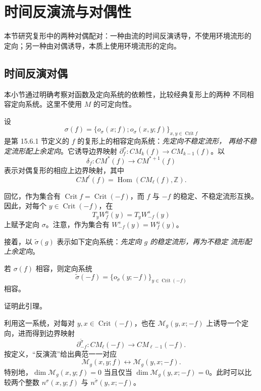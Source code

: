 \section{时间反演流与对偶性}
\label{sec:time-reversal-flow-duality}

本节研究\personFloer{}复形中的两种对偶配对：一种由流的时间反演诱导，不使用环境流形的
定向；另一种由\personPoincare{}对偶诱导，本质上使用环境流形的定向。

\subsection{时间反演对偶}
\label{subsec:time-reversal-duality}

本小节通过明确考察对\personMorse{}函数及定向系统的依赖性，比较经典\personMorse{}复形上的两种
不同相容定向系统。这里不使用 $M$ 的可定向性。

设
\[
 \sigma(f)=\{o_\sigma(x;f);o_\sigma(x,y;f)\}_{x,y\in\operatorname{Crit}f}
\]
是第 15.6.1 节定义的 $f$ 的\personMorse{}复形上的相容定向系统：\emph{先定向不稳定流形，
再给不稳定流形配上余定向}。它诱导\personMorse{}边界映射
$\partial_f^\sigma:CM_k(f)\to CM_{k-1}(f)$。以
\[
 \delta_f:CM^*(f)\longrightarrow CM^{*+1}(f)
\]
表示对偶复形的相应上边界映射，其中
\[
 CM^\ell(f)=\operatorname{Hom}(CM_\ell(f),\mathbb Z).
\]

回忆，作为集合有 $\operatorname{Crit}f=\operatorname{Crit}(-f)$，而 $f$ 与 $-f$
的稳定、不稳定流形互换。因此，对每个
$y\in\operatorname{Crit}(-f)$，在
\[
 T_yW_f^u(y)=T_yW_{-f}^s(y)
\]
上赋予定向 $\sigma$。注意，作为集合有 $W_{-f}^s(y)=W_f^u(y)$。

接着，以 $\widetilde\sigma(g)$ 表示如下定向系统：\emph{先定向 $g$ 的稳定流形，再为不稳定
流形配上余定向}。

\begin{lemma}
\label{lem:time-reversed-orientation-coherent}
若 $\sigma(f)$ 相容，则定向系统
\[
 \widetilde\sigma(-f)
 =\{o_{\widetilde\sigma}(y;-f)\}_{y\in\operatorname{Crit}(-f)}
\]
相容。
\end{lemma}

\begin{exercise}
\label{ex:prove-time-reversed-orientation-coherent}
证明此引理。
\end{exercise}

利用这一系统，对每对 $y,x\in\operatorname{Crit}(-f)$，也在
$\mathcal M_g(y,x;-f)$ 上诱导一个定向，进而得到边界映射
\[
 \partial_{-f}^{\widetilde\sigma}:CM_\ell(-f)\longrightarrow CM_{\ell-1}(-f).
\]
按定义，“反演流”给出典范一一对应
\[
 \mathcal M_g(x,y;f)\longleftrightarrow\mathcal M_g(y,x;-f).
\]
特别地，$\dim\mathcal M_g(x,y;f)=0$ 当且仅当
$\dim\mathcal M_g(y,x;-f)=0$。此时可以比较两个整数
$n^\sigma(x,y;f)$ 与 $n^{\widetilde\sigma}(y,x;-f)$。

